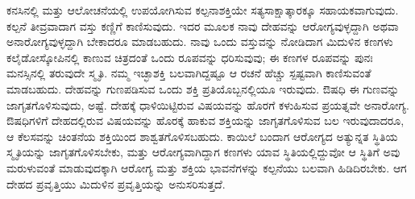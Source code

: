 ಕನಸಿನಲ್ಲಿ ಮತ್ತು ಆಲೋಚನೆಯಲ್ಲಿ ಉಪಯೋಗಿಸುವ ಕಲ್ಪನಾಶಕ್ತಿಯೇ ಸತ್ಯ\break ಸಾಕ್ಷಾತ್ಕಾರಕ್ಕೂ ಸಹಾಯಕವಾಗುವುದು. ಕಲ್ಪನೆ ತೀವ್ರವಾದಾಗ ವಸ್ತು ಕಣ್ಣಿಗೆ ಕಾಣಿಸುವುದು. ಇದರ ಮೂಲಕ ನಾವು ದೇಹವನ್ನು ಆರೋಗ್ಯವುಳ್ಳದ್ದಾಗಿ ಅಥವಾ ಅನಾರೋಗ್ಯವುಳ್ಳದ್ದಾಗಿ ಬೇಕಾದರೂ ಮಾಡಬಹುದು. ನಾವು ಒಂದು ವಸ್ತುವನ್ನು ನೋಡಿದಾಗ ಮಿದುಳಿನ ಕಣಗಳು ಕಲೈಡೋಸ್ಕೋಪಿನಲ್ಲಿ ಕಾಣುವ ಚಿತ್ರದಂತೆ ಒಂದು ರೂಪವನ್ನು ಧರಿಸುವುವು; ಈ ಕಣಗಳ ರೂಪವನ್ನು ಪುನಃ ಮನಸ್ಸಿನಲ್ಲಿ ತರುವುದೇ ಸ್ಮೃತಿ. ನಮ್ಮ ಇಚ್ಛಾಶಕ್ತಿ ಬಲವಾಗಿದ್ದಷ್ಟೂ ಆ ರಚನೆ ಹೆಚ್ಚು ಸ್ಪಷ್ಟವಾಗಿ ಕಾಣಿಸುವಂತೆ ಮಾಡಬಹುದು. ದೇಹವನ್ನು ಗುಣಪಡಿಸುವ ಒಂದು ಶಕ್ತಿ ಪ್ರತಿಯೊಬ್ಬನಲ್ಲಿಯೂ ಇರುವುದು. ಔಷಧಿ ಈ ಗುಣವನ್ನು ಜಾಗೃತಗೊಳಿಸುವುದು, ಅಷ್ಟೆ. ದೇಹಕ್ಕೆ ಧಾಳಿಯಿಟ್ಟಿರುವ ವಿಷಯವನ್ನು ಹೊರಗೆ ಕಳುಹಿಸುವ ಪ್ರಯತ್ನವೇ ಅನಾರೋಗ್ಯ. ಔಷಧಿಗಳಿಗೆ ದೇಹದಲ್ಲಿರುವ ವಿಷಯವನ್ನು ಹೊರಕ್ಕೆ ಹಾಕುವ ಶಕ್ತಿಯನ್ನು ಜಾಗೃತಗೊಳಿಸುವ ಬಲ ಇರುವುದಾದರೂ, ಆ ಕೆಲಸವನ್ನು ಚಿಂತನೆಯ ಶಕ್ತಿಯಿಂದ ಶಾಶ್ವತಗೊಳಿಸಬಹುದು. ಕಾಯಿಲೆ ಬಂದಾಗ ಆರೋಗ್ಯದ ಅತ್ಯುನ್ನತ ಸ್ಥಿತಿಯ ಸ್ಮೃತಿಯನ್ನು ಜಾಗೃತಗೊಳಿಸಬೇಕು, ಮತ್ತು ಆರೋಗ್ಯವಾಗಿದ್ದಾಗ ಕಣಗಳು ಯಾವ ಸ್ಥಿತಿಯಲ್ಲಿದ್ದುವೋ ಆ ಸ್ಥಿತಿಗೆ ಅವು ಮರುಳುವಂತೆ ಮಾಡುವುದಕ್ಕಾಗಿ ಆರೋಗ್ಯ ಮತ್ತು ಶಕ್ತಿಯ ಭಾವನೆಗಳನ್ನು ಕಲ್ಪನೆಯು ಬಲವಾಗಿ ಹಿಡಿದಿರಬೇಕು. ಆಗ ದೇಹದ ಪ್ರವೃತ್ತಿಯು ಮಿದುಳಿನ ಪ್ರವೃತ್ತಿಯನ್ನು ಅನುಸರಿಸುತ್ತದೆ.

